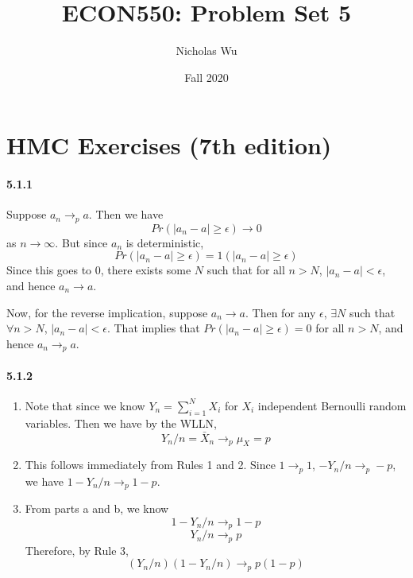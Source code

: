 \documentclass[10pt,letter]{article}
\begin{document}


\title{ECON550: Problem Set 5}

\author{Nicholas Wu}

\date{Fall 2020}

\maketitle
\section*{HMC Exercises (7th edition)}
\paragraph{5.1.1}
Suppose $a_n \to_p a$. Then we have
\[ Pr(|a_n - a| \ge \epsilon) \to 0 \]
as $n\to \infty$. But since $a_n$ is deterministic,
\[ Pr(|a_n - a| \ge \epsilon)  = 1(|a_n - a| \ge \epsilon) \]
Since this goes to $0$, there exists some $N$ such that for all $n > N$, $|a_n - a| < \epsilon$, and hence $a_n \to a$.

Now, for the reverse implication, suppose $a_n \to a$. Then for any $\epsilon$, $\exists N$ such that $\forall n > N$, $|a_n - a| < \epsilon$. That implies that $Pr(|a_n - a| \ge \epsilon) = 0$ for all $n > N$, and hence $a_n \to_p a$.

\paragraph{5.1.2}
\begin{enumerate}[label=(\alph*)]
\item Note that since we know $Y_n = \sum_{i=1}^N X_i$ for $X_i$ independent Bernoulli random variables. Then we have by the WLLN,
\[ Y_n / n = \bar{X}_n \to_p \mu_X = p \]
\item This follows immediately from Rules 1 and 2. Since $1 \to_p 1$, $-Y_n/n \to_p -p$, we have $1-Y_n/n \to_p 1-p$.
\item From parts a and b, we know
\[ 1 - Y_n/n \to_p 1-p \]
\[ Y_n /n \to_p p \]
Therefore, by Rule 3,
\[ (Y_n /n) (1 - Y_n/n) \to_p p(1-p) \]
\end{enumerate}
\end{document}
